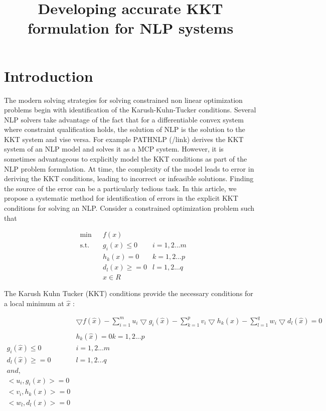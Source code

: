 \documentclass{article}
\title{Developing accurate KKT formulation for NLP systems}
\begin{document}
\section{Introduction}
The modern solving strategies for solving constrained non linear optimization problems begin with identification of the Karush-Kuhn-Tucker conditions. Several NLP solvers take advantage of the fact that for a differentiable convex system where constraint qualification holds, the solution of NLP is the solution to the KKT system and vise versa.  For example PATHNLP (/link) derives the KKT system of an NLP model and solves it as a MCP system.  However, it is sometimes advantageous to explicitly model the KKT conditions as part of the NLP problem formulation. At time, the complexity of the model leads to error in deriving the KKT conditions, leading to incorrect or infeasible solutions. Finding the source of the error can be a particularly tedious task.
In this article, we propose a systematic method for identification of errors in the explicit KKT conditions for solving an NLP. Consider a constrained optimization problem such that 

\begin{equation}
\begin{aligned}
&	\min
& & f(x) \\
& \text{s.t.} & & 	 g_{i}(x) \leqslant 0	&	i = 1,2...m \\
& & &			h_{k}(x) = 0	 &	k = 1,2...p \\
& & &			d_{l}(x) \geqslant =0		&	l = 1,2...q \\
& & &			x \in \!R
\end{aligned}
\end{equation}

The Karush Kuhn Tucker (KKT) conditions provide the necessary conditions for a local minimum at $\hat{x}$ :

\begin{equation}
\begin{aligned}
& \bigtriangledown{f(\hat{x})} - \sum_{i=1}^{m} u_{i} \bigtriangledown{g_{i}(\hat{x})}
			- \sum_{k=1}^{p} v_{i} \bigtriangledown{h_{k}(\hat{x})} - \sum_{l=1}^{q} w_{i} \bigtriangledown{d_{l}(\hat{x})} = 0  \\
\\
& h_{k}(\hat{x}) = 0   k = 1,2...p  \\
g_{i}(\hat{x}) \leq 0&	 i = 1,2...m \\  d_{l}(\hat{x}) \geq =0	&	l = 1,2...q
\\
and,\\
<u_{i},g_{i}(x)> = 0 \\ <v_{i},h_{k}(x)> =0 \\  <w_{l},d_{l}(x)> =0
\end{aligned}
\end{equation}
\end{document}
